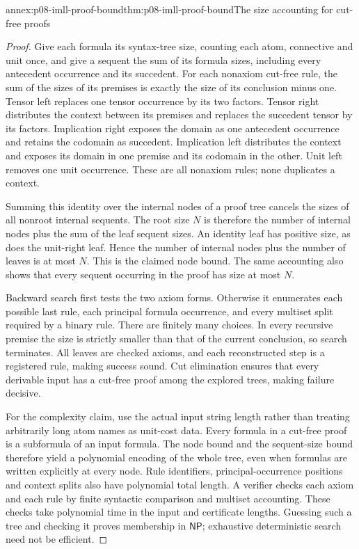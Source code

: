 \begin{annexitem}{annex:p08-imll-proof-bound}{thm:p08-imll-proof-bound}{The size accounting for cut-free proofs}
\begin{proof}
Give each formula its syntax-tree size, counting each atom, connective
and unit once, and give a sequent the sum of its formula sizes,
including every antecedent occurrence and its succedent.
For each nonaxiom cut-free rule, the sum of the sizes of its premises
is exactly the size of its conclusion minus one.
Tensor left replaces one tensor occurrence by its two factors.
Tensor right distributes the context between its premises and replaces
the succedent tensor by its factors. Implication right exposes the
domain as one antecedent occurrence and retains the codomain as
succedent. Implication left distributes the context and exposes its
domain in one premise and its codomain in the other. Unit left
removes one unit occurrence. These are all nonaxiom rules; none
duplicates a context.

Summing this identity over the internal nodes of a proof tree cancels
the sizes of all nonroot internal sequents. The root size \(N\) is
therefore the number of internal nodes plus the sum of the leaf
sequent sizes. An identity leaf has positive size, as does the
unit-right leaf. Hence the number of internal nodes plus the number
of leaves is at most \(N\). This is the claimed node bound.
The same accounting also shows that every sequent occurring in the
proof has size at most \(N\).

Backward search first tests the two axiom forms. Otherwise it enumerates
each possible last rule, each principal formula occurrence, and every
multiset split required by a binary rule. There are finitely many
choices. In every recursive premise the size is strictly smaller
than that of the current conclusion, so search terminates. All leaves
are checked axioms, and each reconstructed step is a registered rule,
making success sound. Cut elimination ensures that every derivable
input has a cut-free proof among the explored trees, making failure
decisive.

For the complexity claim, use the actual input string length rather
than treating arbitrarily long atom names as unit-cost data.
Every formula in a cut-free proof is a subformula of an input formula.
The node bound and the sequent-size bound therefore yield a polynomial
encoding of the whole tree, even when formulas are written explicitly
at every node. Rule identifiers, principal-occurrence positions and
context splits also have polynomial total length.
A verifier checks each axiom and each rule by finite syntactic
comparison and multiset accounting. These checks take polynomial
time in the input and certificate lengths.
Guessing such a tree and checking it proves membership in
\(\mathsf{NP}\); exhaustive deterministic search need not be efficient.
\end{proof}
\end{annexitem}

